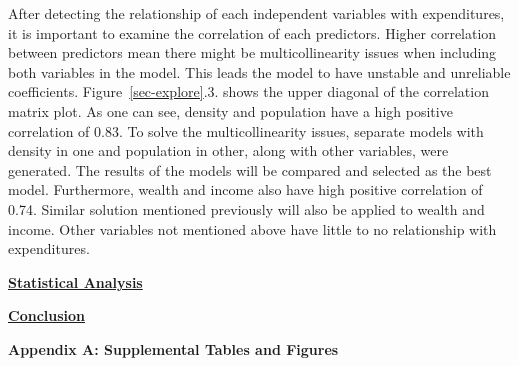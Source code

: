 \documentclass[11pt]{article}\usepackage[]{graphicx}\usepackage[]{color}
\begin{document}
\noindent After detecting the relationship of each independent variables with expenditures, it is important to examine the correlation of each predictors. Higher correlation between predictors mean there might be multicollinearity issues when including both variables in the model. This leads the model to have unstable and unreliable coefficients. Figure~\ref{sec-explore}.3. shows the upper diagonal of the correlation matrix plot. As one can see, density and population have a high positive correlation of 0.83. To solve the multicollinearity issues, separate models with density in one and population in other, along with other variables, were generated. The results of the models will be compared and selected as the best model. Furthermore, wealth and income also have high positive correlation of 0.74. Similar solution mentioned previously will also be applied to wealth and income. Other variables not mentioned above have little to no relationship with expenditures.          


\hfill \break

\noindent\textbf{\underline{Statistical Analysis}}
\hfill \break

\noindent\textbf{\underline{Conclusion}}
\hfill \break


\clearpage
\newpage
\noindent \Large{{\bf Appendix A: Supplemental Tables and Figures}}
\end{document}
